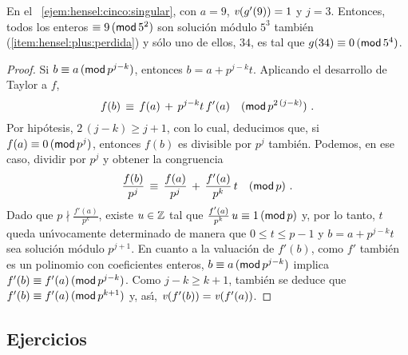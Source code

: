 \begin{ejemHensel}\label{ejem:hensel:cinco:singular:recap}
	En el \ejemname~\ref{ejem:hensel:cinco:singular},
	con $a=9$, $\valuacion(g'(9))=1$ y $j=3$. Entonces,
	todos los enteros $\equiv 9\tmodulo[5^2]$ son
	soluci\'on m\'odulo $5^3$ tambi\'en
	(\eqref{item:hensel:plus:perdida}) y s\'olo uno de ellos,
	$34$, es tal que $g(34)\equiv 0\tmodulo[5^4]$.
\end{ejemHensel}

\begin{proof}
	Si $b\equiv a\tmodulo[p^{j-k}]$, entonces $b=a+p^{j-k}t$.
	Aplicando el desarrollo de Taylor a $f$,
	\begin{displaymath}
		f(b)\,\equiv\,f(a)\,+\,p^{j-k}t\,f'(a)\modulo[p^{2\,(j-k)}]
		\dispstop
	\end{displaymath}
	Por hip\'otesis, $2\,(j-k)\geq j+1$, con lo cual,
	deducimos que, si $f(a)\equiv 0\tmodulo[p^j]$, entonces
	$f(b)$ es divisible por $p^j$ tambi\'en.
	Podemos, en ese caso, dividir por $p^j$ y obtener la congruencia
	\begin{displaymath}
		\frac{f(b)}{p^j}\,\equiv\,\frac{f(a)}{p^j}\,+\,
			\frac{f'(a)}{p^k}\,t\modulo[p]
		\dispstop
	\end{displaymath}
	Dado que $p\nmid\frac{f'(a)}{p^k}$, existe
	$u\in\Enteros$ tal que $\frac{f'(a)}{p^k}\,u\equiv 1\tmodulo[p]$
	y, por lo tanto, $t$ queda un\'{\i}vocamente determinado
	de manera que $0\leq t\leq p-1$ y $b=a+p^{j-k}t$ sea soluci\'on
	m\'odulo $p^{j+1}$. En cuanto a la valuaci\'on de $f'(b)$,
	como $f'$ tambi\'en es un polinomio con coeficientes enteros,
	$b\equiv a\tmodulo[p^{j-k}]$ implica
	$f'(b)\equiv f'(a)\tmodulo[p^{j-k}]$.
	Como $j-k\geq k+1$, tambi\'en se deduce que
	$f'(b)\equiv f'(a)\tmodulo[p^{k+1}]$ y, as\'{\i},
	$\valuacion(f'(b))=\valuacion(f'(a))$.
\end{proof}

\subsection*{Ejercicios}


